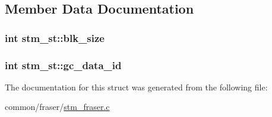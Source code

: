 \subsection{Member Data Documentation}
\hypertarget{structstm__st_a1d180e95b1bb9493a01a4b27ee59fba0}{
\subsubsection[{blk\-\_\-size}]{\setlength{\rightskip}{0pt plus 5cm}int stm\-\_\-st\-::blk\-\_\-size}}\label{structstm__st_a1d180e95b1bb9493a01a4b27ee59fba0}
\hypertarget{structstm__st_a8d4aa8ea05094df2806473132aacf807}{
\subsubsection[{gc\-\_\-data\-\_\-id}]{\setlength{\rightskip}{0pt plus 5cm}int stm\-\_\-st\-::gc\-\_\-data\-\_\-id}}\label{structstm__st_a8d4aa8ea05094df2806473132aacf807}


The documentation for this struct was generated from the following file\-:\begin{DoxyCompactItemize}
\item 
common/fraser/\hyperlink{stm__fraser_8c}{stm\-\_\-fraser.\-c}\end{DoxyCompactItemize}
